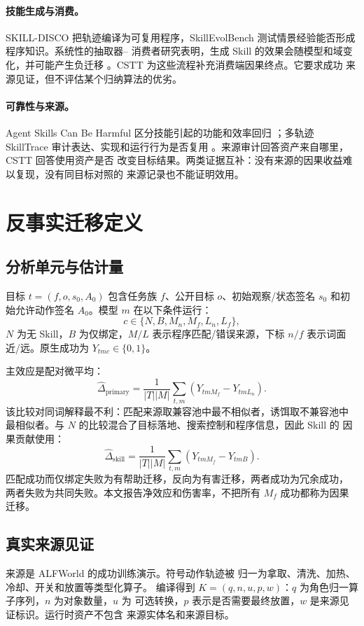 \documentclass[10pt]{article}
\begin{document}
\paragraph{技能生成与消费。}
SKILL-DISCO 把轨迹编译为可复用程序\citep{guo2026skilldisco}，SkillEvolBench
测试情景经验能否形成程序知识\citep{lei2026skillevolbench}。系统性的抽取器--
消费者研究表明，生成 Skill 的效果会随模型和域变化，并可能产生负迁移
\citep{huang2026consumption}。CSTT 为这些流程补充消费端因果终点。它要求成功
来源见证，但不评估某个归纳算法的优劣。

\paragraph{可靠性与来源。}
Agent Skills Can Be Harmful 区分技能引起的功能和效率回归
\citep{dong2026harmful}；多轨迹 SkillTrace 审计表达、实现和运行行为是否复用
\citep{chen2026multitrace}。来源审计回答资产来自哪里，CSTT 回答使用资产是否
改变目标结果。两类证据互补：没有来源的因果收益难以复现，没有同目标对照的
来源记录也不能证明效用。

\section{反事实迁移定义}
\subsection{分析单元与估计量}
目标 $t=(f,o,s_0,A_0)$ 包含任务族 $f$、公开目标 $o$、初始观察/状态签名
$s_0$ 和初始允许动作签名 $A_0$。模型 $m$ 在以下条件运行：
\[
c\in\{N,B,M_n,M_f,L_n,L_f\},
\]
$N$ 为无 Skill，$B$ 为仅绑定，$M/L$ 表示程序匹配/错误来源，下标 $n/f$
表示词面近/远。原生成功为 $Y_{tmc}\in\{0,1\}$。

主效应是配对微平均：
\[
\widehat\Delta_{\mathrm{primary}}=
\frac{1}{|T||M|}\sum_{t,m}(Y_{tmM_f}-Y_{tmL_n}).
\]
该比较对同词解释最不利：匹配来源取兼容池中最不相似者，诱饵取不兼容池中
最相似者。与 $N$ 的比较混合了目标落地、搜索控制和程序信息，因此 Skill 的
因果贡献使用：
\[
\widehat\Delta_{\mathrm{skill}}=
\frac{1}{|T||M|}\sum_{t,m}(Y_{tmM_f}-Y_{tmB}).
\]
匹配成功而仅绑定失败为有帮助迁移，反向为有害迁移，两者成功为冗余成功，
两者失败为共同失败。本文报告净效应和伤害率，不把所有 $M_f$ 成功都称为因果
迁移。

\subsection{真实来源见证}
来源是 ALFWorld 的成功训练演示\citep{shridhar2021alfworld}。符号动作轨迹被
归一为拿取、清洗、加热、冷却、开关和放置等类型化算子。
编译得到 $K=(q,n,u,p,w)$：$q$ 为角色归一算子序列，$n$ 为对象数量，$u$ 为
可选转换，$p$ 表示是否需要最终放置，$w$ 是来源见证标识。运行时资产不包含
来源实体名和来源目标。
\end{document}
